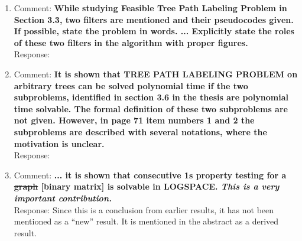 \documentclass{article}
\begin{document}
\begin{enumerate}
\item Comment: {\bf While studying Feasible Tree Path Labeling Problem
  in Section 3.3, two filters are mentioned and their pseudocodes
  given. If possible, state the problem in words. ... Explicitly state
the roles of these two filters in the algorithm with proper
figures.}\\
Response: 

\item Comment: {\bf It is shown that TREE PATH LABELING PROBLEM on
    arbitrary trees can be solved polynomial time if the two
    subproblems, identified in section 3.6 in the thesis are
    polynomial time solvable. The formal definition of these two
    subproblems are not given. However, in page 71 item numbers 1 and
    2 the subproblems are described with several notations, where the
    motivation is unclear.}\\
Response: 

\item Comment: {\bf ... it is shown that consecutive 1s property
    testing for a \sout {graph} [binary matrix] is solvable in LOGSPACE. {\em This is a very
      important contribution.}}\\
Response: Since this is a conclusion from earlier results, it has not
been mentioned as a ``new'' result. It is mentioned in the abstract as a
derived result.
\end{enumerate}




%
\end{document}
